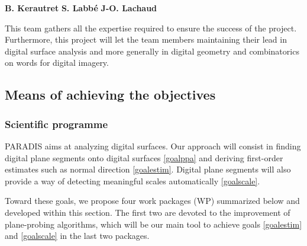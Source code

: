 \textbf{B. Kerautret} 
\textbf{S. Labb\'{e}} 
\textbf{J-O. Lachaud}


This team gathers all the expertise required to ensure the success of the project.
Furthermore, this project will let the team members maintaining their lead in digital surface analysis 
and more generally in digital geometry and combinatorics on words for digital imagery. 


\subsection{Means of achieving the objectives}


\subsubsection{Scientific programme}
\label{sec:wp}


PARADIS aims at analyzing digital surfaces. Our approach will consist in finding
digital plane segments onto digital surfaces \ref{goalppa} and deriving first-order
estimates such as normal direction \ref{goalestim}. Digital plane segments will
also provide a way of detecting meaningful scales automatically \ref{goalscale}.

Toward these goals, we propose four work packages (WP) summarized below and
developed within this section. The first two are devoted to the improvement of
plane-probing algorithms, which will be our main tool to achieve goals \ref{goalestim}
and \ref{goalscale} in the last two packages. 

